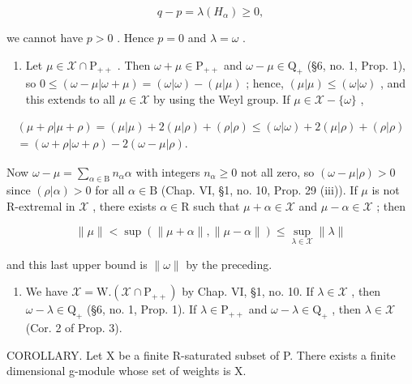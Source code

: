 \[
q - p = \lambda (H _ {\alpha}) \geq 0,
\]

we cannot have \(p > 0\) . Hence \(p = 0\) and \(\lambda = \omega\) .

\begin{enumerate}
\def\labelenumi{(\roman{enumi})}
\setcounter{enumi}{2}
\tightlist
\item
  Let \(\mu \in \mathcal{X} \cap \mathrm{P}_{++}\) . Then \(\omega + \mu \in \mathrm{P}_{++}\) and \(\omega - \mu \in \mathrm{Q}_+\) (§6, no. 1, Prop. 1), so \(0 \leq (\omega - \mu|\omega + \mu) = (\omega|\omega) - (\mu|\mu)\) ; hence, \((\mu|\mu) \leq (\omega|\omega)\) , and this extends to all \(\mu \in \mathcal{X}\) by using the Weyl group. If \(\mu \in \mathcal{X} - \{\omega\}\) ,
\end{enumerate}

\[
\begin{array}{c} (\mu + \rho | \mu + \rho) = (\mu | \mu) + 2 (\mu | \rho) + (\rho | \rho) \leq (\omega | \omega) + 2 (\mu | \rho) + (\rho | \rho) \\ = (\omega + \rho | \omega + \rho) - 2 (\omega - \mu | \rho). \end{array}
\]

Now \(\omega - \mu = \sum_{\alpha \in \mathrm{B}} n_{\alpha} \alpha\) with integers \(n_{\alpha} \geq 0\) not all zero, so \((\omega - \mu | \rho) > 0\) since \((\rho | \alpha) > 0\) for all \(\alpha \in \mathrm{B}\) (Chap. VI, §1, no. 10, Prop. 29 (iii)). If \(\mu\) is not R-extremal in \(\mathcal{X}\) , there exists \(\alpha \in \mathrm{R}\) such that \(\mu + \alpha \in \mathcal{X}\) and \(\mu - \alpha \in \mathcal{X}\) ; then

\[
\| \mu \| <   \sup (\| \mu + \alpha \|, \| \mu - \alpha \|) \leq \sup _ {\lambda \in \mathcal {X}} \| \lambda \|
\]

and this last upper bound is \(\|\omega\|\) by the preceding.

\begin{enumerate}
\def\labelenumi{(\roman{enumi})}
\setcounter{enumi}{3}
\tightlist
\item
  We have \(\mathcal{X} = \mathrm{W.}(\mathcal{X}\cap \mathrm{P}_{++})\) by Chap. VI, §1, no. 10. If \(\lambda \in \mathcal{X}\) , then \(\omega -\lambda \in \mathrm{Q}_{+}\) (§6, no. 1, Prop. 1). If \(\lambda \in \mathrm{P}_{++}\) and \(\omega -\lambda \in \mathrm{Q}_{+}\) , then \(\lambda \in \mathcal{X}\) (Cor. 2 of Prop. 3).
\end{enumerate}

COROLLARY. Let X be a finite R-saturated subset of P. There exists a finite dimensional g-module whose set of weights is X.

